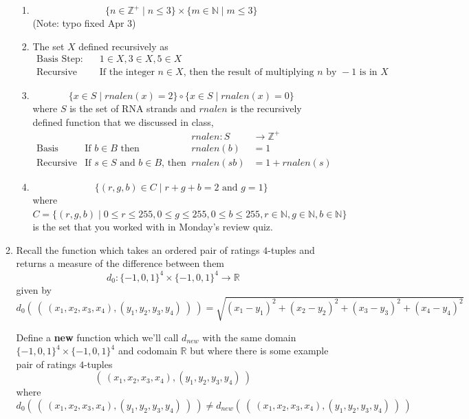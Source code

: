 \begin{enumerate}[labelindent=0pt, leftmargin=0pt]
\begin{enumerate}
\begin{enumerate}
\item $$\{ n \in \mathbb{Z}^+ \mid n \leq 3 \} \times \{ m \in \mathbb{N} \mid m \leq 3\}$$ (Note: typo fixed Apr 3)
\item The set $X$ defined recursively as 
    \[
    \begin{array}{ll}
    \textrm{Basis Step: } & 1 \in X, 3 \in X, 5 \in X \\
    \textrm{Recursive Step: } & \textrm{If the integer } n \in X \textrm{, then the result of multiplying } n \textrm{ by } -1 \textrm{ is in }X
    \end{array}
    \]
\item $$\{ x \in S \mid rnalen(x) = 2 \} \circ \{x \in S \mid rnalen(x) = 0 \}$$
where $S$ is the set of RNA strands and $rnalen$ is the recursively defined
function that we discussed in class,
\[
\begin{array}{llll}
& & \textit{rnalen} : S & \to \mathbb{Z}^+ \\
\textrm{Basis Step:} & \textrm{If } b \in B\textrm{ then } & \textit{rnalen}(b) & = 1 \\
\textrm{Recursive Step:} & \textrm{If } s \in S\textrm{ and }b \in B\textrm{, then  } & \textit{rnalen}(sb) & = 1 + \textit{rnalen}(s)
\end{array}
\]
\item $$\{ (r,g,b) \in C \mid r+g+b = 2 \textrm{ and } g=1\}$$ where 
$C = \{ (r,g,b) \mid 0 \leq r \leq 255, 0 \leq g \leq 255, 0 \leq b \leq 255, r \in \mathbb{N}, g \in \mathbb{N}, b \in \mathbb{N} \}$
is the set that you worked with in Monday's review quiz.
\end{enumerate}

\item\gradeCorrect Recall the function which takes an ordered pair of ratings $4$-tuples and returns a measure of the difference between them
\[
    d_0: \{-1,0,1\}^4 \times \{-1,0,1\}^4 \to \mathbb{R}
\]
given by
\[
d_0 (~(~ (x_1, x_2, x_3, x_4), (y_1, y_2, y_3, y_4) ~) ~) = \sqrt{ (x_1 - y_1)^2 + (x_2 - y_2)^2 + (x_3 -y_3)^2 + (x_4 -y_4)^2}
\]

Define a {\bf new} function which we'll call $d_{new}$ with the same domain $\{-1,0,1\}^4 \times \{-1,0,1\}^4$
and codomain $\mathbb{R}$ but where there is some example pair of ratings $4$-tuples 
\[(~ (x_1, x_2, x_3, x_4), (y_1, y_2, y_3, y_4)~)\]
where
\[
d_0 (~(~ (x_1, x_2, x_3, x_4), (y_1, y_2, y_3, y_4) ~) ~) \neq d_{new} (~(~ (x_1, x_2, x_3, x_4), (y_1, y_2, y_3, y_4) ~) ~)
\]


\end{enumerate}
\end{enumerate}
